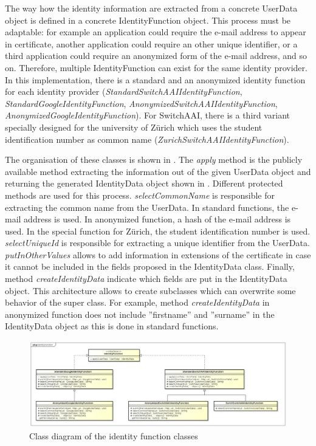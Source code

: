\documentclass[oneside]{scrreprt}
\begin{document}
The way how the identity information are extracted from a concrete UserData object is defined in a concrete IdentityFunction object. This process must be adaptable: for example an application could require the e-mail address to appear in certificate, another application could require an other unique identifier, or a third application could require an anonymized form of the e-mail address, and so on. Therefore, multiple IdentityFunction can exist for the same identity provider. In this implementation, there is a standard and an anonymized identity function for each identity provider (\textit{StandardSwitchAAIIdentityFunction}, \textit{StandardGoogleIdentityFunction}, \textit{AnonymizedSwitchAAIIdentityFunction}, \textit{AnonymizedGoogleIdentityFunction}). For SwitchAAI, there is a third variant specially designed for the university of Zürich which uses the student identification number as common name (\textit{ZurichSwitchAAIIdentityFunction}).

The organisation of these classes is shown in . The \textit{apply} method is the publicly available method extracting the information out of the given UserData object and returning the generated IdentityData object shown in . Different protected methods are used for this process. \textit{selectCommonName} is responsible for extracting the common name from the UserData. In standard functions, the e-mail address is used. In anonymized function, a hash of the e-mail address is used. In the special function for Zürich, the student identification number is used. \textit{selectUniqueId} is responsible for extracting a unique identifier from the UserData. \textit{putInOtherValues} allows to add information in extensions of the certificate in case it cannot be included in the fields proposed in the IdentityData class. Finally, method \textit{createIdentityData} indicate which fields are put in the IdentityData object. This architecture allows to create subclasses which can overwrite some behavior of the super class. For example, method \textit{createIdentityData} in anonymized function does not include ''firstname'' and ''surname'' in the IdentityData object as this is done in standard functions.

\begin{figure}[ht]
\centerline{
\includegraphics[width=\textwidth]{figs/identity_function_class_diagram.png}}
\caption{Class diagram of the identity function classes}
\label{fig:identity_function_class_diagram}
\end{figure}
\end{document}
